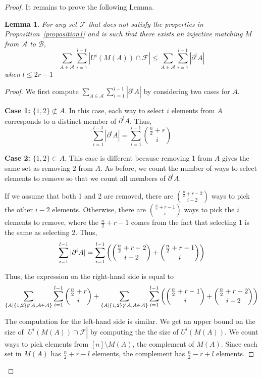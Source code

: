 \documentclass[12pt]{article}
\theoremstyle{plain}
\newtheorem{lemma}[theorem]{Lemma}
\theoremstyle{definition}
\theoremstyle{remark}
\newcommand{\F}{\mathcal{F}}
\newcommand{\A}{\mathcal{A}}
\newcommand{\B}{\mathcal{B}}
\begin{document}
\begin{proof}

It remains to prove the following Lemma.

\begin{lemma} For any set $\F$ that does not satisfy the properties in Proposition~\ref{proposition1} and is such that there exists an injective matching $M$ from $\A$ to $\B$,
\label{lemma1}
\[ \sum_{A\in \A}\sum_{i = 1}^{l-1} |U^i(M(A)) \cap \F| \leq \sum_{A \in \A}\sum_{i = 1}^{l-1} |\partial^i A | \]
when $l \leq 2r-1$
\end{lemma}

\begin{proof} We first compute $\sum_{A \in \A}\sum_{i = 1}^{l-1} |\partial^i A |$ by considering two cases for $A$.

\textbf{Case 1:} $\{1,2\} \not\subset A$. In this case, each way to select $i$ elements from $A$ corresponds to a distinct member of $\partial^i A$. Thus,
\[ \sum_{i=1}^{l-1} |\partial^i A| = \sum_{i=1}^{l-1}\binom{\frac{n}{2}+r}{i} \]

\textbf{Case 2:} $\{1,2\} \subset A$. This case is different because removing 1 from $A$ gives the same set as removing 2 from $A$. As before, we count the number of ways to select elements to remove so that we count all members of $\partial^i A$.

If we assume that both 1 and 2 are removed, there are $\binom{\frac{n}{2} + r - 2}{i-2}$ ways to pick the other $i-2$ elements. Otherwise, there are $\binom{\frac{n}{2}+r-1}{i}$ ways to pick the $i$ elements to remove, where the $\frac{n}{2} + r - 1$ comes from the fact that selecting 1 is the same as selecting 2. Thus, 
\[ \sum_{i=1}^{l-1} |\partial^i A| = \sum_{i=1}^{l-1} \left( \dbinom{\frac{n}{2}+r-2}{i-2} + \dbinom{\frac{n}{2} + r - 1}{i}\right)\]

Thus, the expression on the right-hand side is equal to
\[ \sum_{\{A | \{1, 2\} \not\subset A, A \in \A\}} \sum_{i=1}^{l-1} \dbinom{\frac{n}{2} + r}{i} + \sum_{\{A | \{1, 2\} \not\subset A, A \in \A\}} \sum_{i=1}^{l-1} \left( \dbinom{\frac{n}{2}+r-1}{i} + \dbinom{\frac{n}{2}+r-2}{i-2}\right) \]

The computation for the left-hand side is similar. We get an upper bound on the size of $|U^i(M(A)) \cap \F|$ by computing the the size of $U^i(M(A))$. We count ways to pick elements from $[n] \setminus M(A)$, the complement of $M(A)$. Since each set in $M(A)$ has $\frac{n}{2} + r - l$ elements, the complement has $\frac{n}{2} - r + l$ elements. 


\end{proof}
\end{proof}
\end{document}
